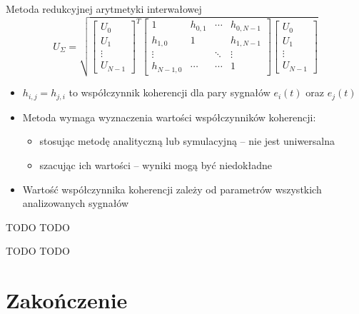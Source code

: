 \documentclass[12pt, polish, aspectratio = 169]{beamer}
\begin{document}
\begin{frame}{Metoda redukcyjnej arytmetyki interwałowej}
\begin{equation}
U_{\Sigma} = \sqrt{
\begin{bmatrix}
U_{0} \\ U_{1} \\ \vdots \\ U_{N-1}
\end{bmatrix}^{T}
\begin{bmatrix}
1         & h_{0,1} & \cdots & h_{0,N-1} \\
h_{1,0}   & 1       &        & h_{1,N-1} \\
\vdots    &         & \ddots & \vdots    \\
h_{N-1,0} & \cdots  & \cdots & 1
\end{bmatrix}
\begin{bmatrix}
U_{0} \\ U_{1} \\ \vdots \\ U_{N-1}
\end{bmatrix}}
\label{eq:unc_matrix}
\end{equation}
\begin{itemize}
\item $h_{i,j} = h_{j,i}$ to współczynnik koherencji dla pary sygnałów $e_{i}(t)$ oraz $e_{j}(t)$
\item Metoda wymaga wyznaczenia wartości współczynników koherencji:
	\begin{itemize}
	\item stosując metodę analityczną lub symulacyjną -- nie jest uniwersalna
	\item szacując ich wartości -- wyniki mogą być niedokładne
	\end{itemize}
\item Wartość współczynnika koherencji zależy od parametrów wszystkich analizowanych sygnałów
\end{itemize}
\end{frame}


\begin{frame}{TODO}
TODO
\end{frame}


\begin{frame}{TODO}
TODO
\end{frame}

\section*{Zakończenie}

\begin{frame}[plain]
\lastpage
\end{frame}
\end{document}

